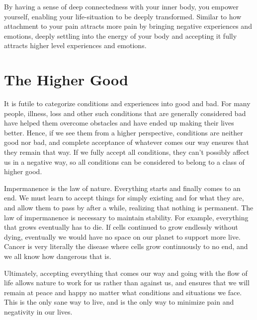 \documentclass[
]{book}
\begin{document}
By having a sense of deep connectedness with your inner body, you empower yourself, enabling your life-situation to be deeply transformed. Similar to how attachment to your pain attracts more pain by bringing negative experiences and emotions, deeply settling into the energy of your body and accepting it fully attracts higher level experiences and emotions.

\hypertarget{the-higher-good}{%
\section{The Higher Good}\label{the-higher-good}}

It is futile to categorize conditions and experiences into good and bad. For many people, illness, loss and other such conditions that are generally considered bad have helped them overcome obstacles and have ended up making their lives better. Hence, if we see them from a higher perspective, conditions are neither good nor bad, and complete acceptance of whatever comes our way ensures that they remain that way. If we fully accept all conditions, they can't possibly affect us in a negative way, so all conditions can be considered to belong to a class of higher good.

Impermanence is the law of nature. Everything starts and finally comes to an end. We must learn to accept things for simply existing and for what they are, and allow them to pass by after a while, realizing that nothing is permanent. The law of impermanence is necessary to maintain stability. For example, everything that grows eventually has to die. If cells continued to grow endlessly without dying, eventually we would have no space on our planet to support more live. Cancer is very literally the disease where cells grow continuously to no end, and we all know how dangerous that is.

Ultimately, accepting everything that comes our way and going with the flow of life allows nature to work for us rather than against us, and ensures that we will remain at peace and happy no matter what conditions and situations we face. This is the only sane way to live, and is the only way to minimize pain and negativity in our lives.

  
\end{document}

